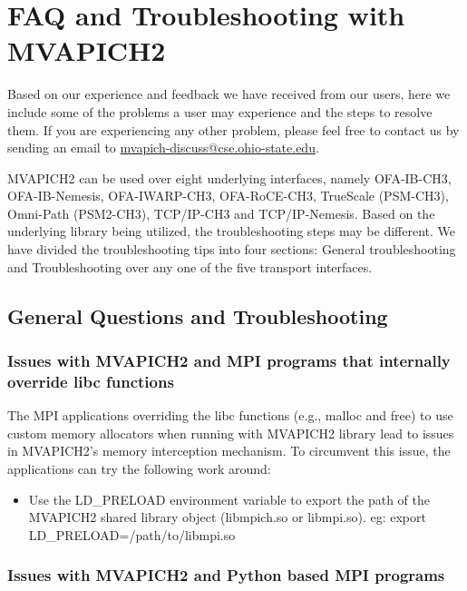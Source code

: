 \section{FAQ and Troubleshooting with MVAPICH2}
\label{sec:troubleshooting}

Based on our experience and feedback we have received from our users, here we
include some of the problems a user may experience and the steps to resolve
them. If you are experiencing any other problem, please feel free to contact us
by sending an email to
\href{mailto:mvapich-discuss@cse.ohio-state.edu}{mvapich-discuss@cse.ohio-state.edu}.

MVAPICH2 can be used over eight underlying interfaces, namely OFA-IB-CH3,
OFA-IB-Nemesis, OFA-IWARP-CH3, OFA-RoCE-CH3, TrueScale (PSM-CH3),
Omni-Path (PSM2-CH3), TCP/IP-CH3  and
TCP/IP-Nemesis. Based on the underlying library being utilized, the
troubleshooting steps may be different. We have divided the troubleshooting tips
into four sections: General troubleshooting and Troubleshooting over any one of
the five transport interfaces.

\subsection{General Questions and Troubleshooting}

\subsubsection{Issues with MVAPICH2 and MPI programs that internally override libc functions}

The MPI applications overriding the libc functions (e.g., malloc and free) to use custom memory allocators when running with MVAPICH2 library lead to issues in MVAPICH2's memory interception mechanism. To circumvent this issue, the applications can try the following work around:

\begin{itemize}
    \item{Use the LD\_PRELOAD environment variable to export the path of
            the MVAPICH2 shared library object (libmpich.so or libmpi.so).
            eg: export LD\_PRELOAD=/path/to/libmpi.so}
\end{itemize}

\subsubsection{Issues with MVAPICH2 and Python based MPI programs}

